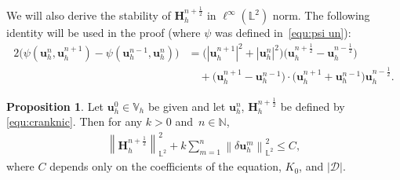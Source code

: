 \documentclass[11pt, reqno]{amsart}
\theoremstyle{definition}
\newtheorem{proposition}[theorem]{Proposition}
\theoremstyle{remark}
\numberwithin{equation}{section}
\newcommand{\bff}{\boldsymbol}
\newcommand{\bb}{\mathbb}
\newcommand{\norm}[2]{\left\|{#1}\right\|_{#2}}
\begin{document}
We will also derive the stability of $\bff{H}_h^{n+\frac{1}{2}}$ in $\ell^\infty(\bb{L}^2)$ norm. The following identity will be used in the proof (where $\psi$ was defined in~\eqref{equ:psi un}):
\begin{align}
	\nonumber
	\label{equ:identity psi}
	2 \big(\psi(\bff{u}_h^n, \bff{u}_h^{n+1})-\psi(\bff{u}_h^{n-1},\bff{u}_h^n) \big)
	&=
	\big( |\bff{u}_h^{n+1}|^2 + |\bff{u}_h^n|^2 \big) \big(\bff{u}_h^{n+\frac{1}{2}} - \bff{u}_h^{n-\frac{1}{2}} \big)
	\\
	&\quad 
	+
	\big(\bff{u}_h^{n+1}- \bff{u}_h^{n-1}\big) \cdot \big(\bff{u}_h^{n+1}+\bff{u}_h^{n-1}\big) \bff{u}_h^{n-\frac{1}{2}}.
\end{align}

\begin{proposition}
Let $\bff{u}_h^0 \in \bb{V}_h$ be given and let $\bff{u}_h^n$, $\bff{H}_h^{n+\frac{1}{2}}$ be defined by \eqref{equ:cranknic}. Then for any $k>0$ and~$n\in \bb{N}$,
\begin{align}\label{equ:Hn L2 stab}
	\norm{\bff{H}_h^{n+\frac{1}{2}}}{\bb{L}^2}^2
	+
	k \sum_{m=1}^n \norm{\delta \bff{u}_h^m}{\bb{L}^2}^2
	\leq
	C,
\end{align}
where $C$ depends only on the coefficients of the equation, $K_0$, and $|\mathscr{D}|$.
\end{proposition}
\end{document}

